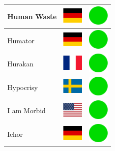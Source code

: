 \documentclass[12pt, a4paper, twoside]{report}
\begin{document}
\begin{center}
\begin{longtable}{|p{5cm}|p{2cm}|p{2cm}|}
Human Waste & \includegraphics[width=1cm]{4x3/de} & \includegraphics[width=1cm]{likes/y} \\ \hline
Humator & \includegraphics[width=1cm]{4x3/de} & \includegraphics[width=1cm]{likes/y} \\ \hline
Hurakan & \includegraphics[width=1cm]{4x3/fr} & \includegraphics[width=1cm]{likes/y} \\ \hline
Hypocrisy & \includegraphics[width=1cm]{4x3/se} & \includegraphics[width=1cm]{likes/y} \\ \hline
I am Morbid & \includegraphics[width=1cm]{4x3/us} & \includegraphics[width=1cm]{likes/y} \\ \hline
Ichor & \includegraphics[width=1cm]{4x3/de} & \includegraphics[width=1cm]{likes/y} \\ \hline

\end{longtable}
\end{center}
\end{document}
